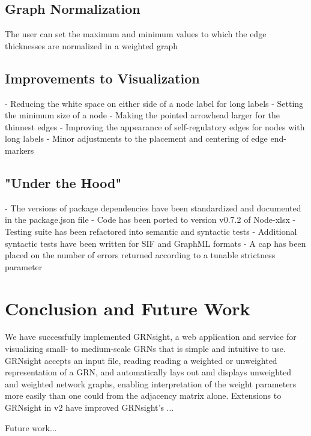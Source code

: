 \documentclass[sigconf,review,anonymous]{acmart}
\begin{document}
\subsection{Graph Normalization}
The user can set the maximum and minimum values to which the edge thicknesses are normalized in a weighted graph

\subsection{Improvements to Visualization}
- Reducing the white space on either side of a node label for long labels
- Setting the minimum size of a node
- Making the pointed arrowhead larger for the thinnest edges
- Improving the appearance of self-regulatory edges for nodes with long labels
- Minor adjustments to the placement and centering of edge end-markers

\subsection{"Under the Hood"}
- The versions of package dependencies have been standardized and documented in the package.json file
- Code has been ported to version v0.7.2 of Node-xlsx
- Testing suite has been refactored into semantic and syntactic tests
- Additional syntactic tests have been written for SIF and GraphML formats
- A cap has been placed on the number of errors returned according to a tunable strictness parameter 

\section{Conclusion and Future Work}
We have successfully implemented GRNsight, a web application and service for visualizing small- to medium-scale GRNs that is simple and intuitive to use. GRNsight accepts an input file, reading reading a weighted or unweighted representation of a GRN, and automatically lays out and displays unweighted and weighted network graphs, enabling interpretation of the weight parameters more easily than one could from the adjacency matrix alone. Extensions to GRNsight in v2 have improved GRNsight's ...

Future work...


 
\end{document}
